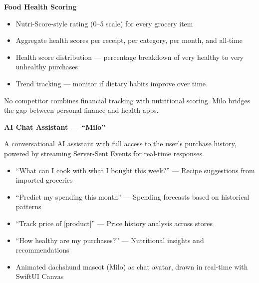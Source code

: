 \documentclass[11pt,a4paper]{article}
\begin{document}
\vspace{0.5em}

\begin{appbox}
{\color{milopurple!80}\fontsize{14}{17}\selectfont\bfseries Food Health Scoring}

\vspace{0.3em}
\begin{itemize}[leftmargin=1em, itemsep=2pt, font=\small]
  \item Nutri-Score-style rating (0--5 scale) for every grocery item
  \item Aggregate health scores per receipt, per category, per month, and all-time
  \item Health score distribution --- percentage breakdown of very healthy to very unhealthy purchases
  \item Trend tracking --- monitor if dietary habits improve over time
\end{itemize}

\vspace{0.3em}
{\small\color{milogray} No competitor combines financial tracking with nutritional scoring. Milo bridges the gap between personal finance and health apps.}
\end{appbox}

\vspace{0.5em}

\begin{appbox}
{\color{milopurple!80}\fontsize{14}{17}\selectfont\bfseries AI Chat Assistant --- ``Milo''}

\vspace{0.3em}
A conversational AI assistant with full access to the user's purchase history, powered by streaming Server-Sent Events for real-time responses.

\begin{itemize}[leftmargin=1em, itemsep=2pt, font=\small]
  \item ``What can I cook with what I bought this week?'' --- Recipe suggestions from imported groceries
  \item ``Predict my spending this month'' --- Spending forecasts based on historical patterns
  \item ``Track price of [product]'' --- Price history analysis across stores
  \item ``How healthy are my purchases?'' --- Nutritional insights and recommendations
  \item Animated dachshund mascot (Milo) as chat avatar, drawn in real-time with SwiftUI Canvas
\end{itemize}
\end{appbox}
\end{document}
